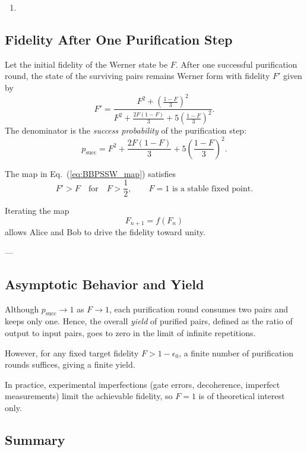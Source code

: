 \documentclass[conference]{IEEEtran}
\begin{document}
\begin{enumerate}
    \item 
\end{enumerate}

\subsection{Fidelity After One Purification Step}

Let the initial fidelity of the Werner state be $F$.
After one successful purification round, the state of the surviving pairs
remains Werner form with fidelity $F'$ given by
\begin{equation}
F' = \frac{F^2 + \left(\frac{1-F}{3}\right)^2}
{F^2 + \frac{2F(1-F)}{3} + 5\left(\frac{1-F}{3}\right)^2}.
\label{eq:BBPSSW_map}
\end{equation}
The denominator is the \emph{success probability} of the purification step:
\begin{equation}
p_{\text{succ}} = F^2 + \frac{2F(1-F)}{3} + 5\left(\frac{1-F}{3}\right)^2.
\end{equation}

The map in Eq.~(\ref{eq:BBPSSW_map}) satisfies
\[
F' > F \quad \text{for} \quad F > \frac{1}{2}, \qquad F=1 \text{ is a stable fixed point.}
\]

Iterating the map
\[
F_{n+1} = f(F_n)
\]
allows Alice and Bob to drive the fidelity toward unity.

---

\subsection{Asymptotic Behavior and Yield}

Although $p_{\text{succ}}\to1$ as $F\to1$, 
each purification round consumes two pairs and keeps only one.
Hence, the overall \emph{yield} of purified pairs,
defined as the ratio of output to input pairs, goes to zero in the limit
of infinite repetitions.

However, for any fixed target fidelity $F>1-\epsilon_0$,
a finite number of purification rounds suffices, giving a finite yield.

In practice, experimental imperfections (gate errors, decoherence, 
imperfect measurements) limit the achievable fidelity, so $F=1$
is of theoretical interest only.

\subsection{Summary}
\end{document}
